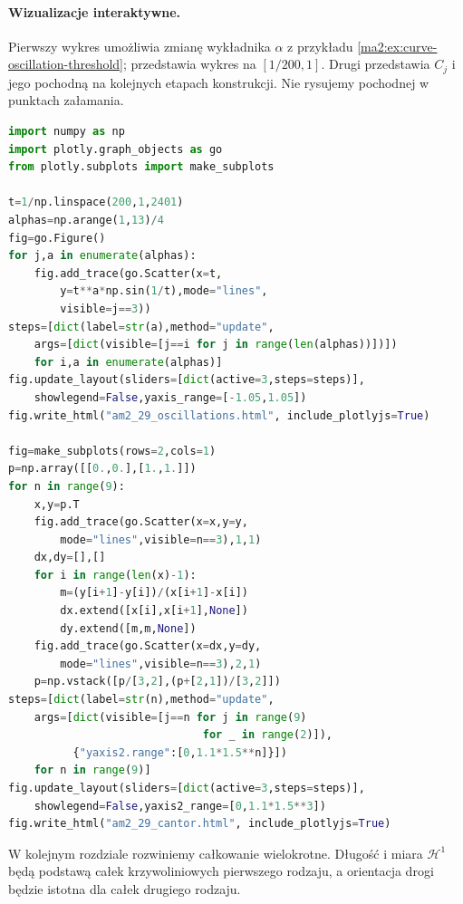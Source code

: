 \paragraph{Wizualizacje interaktywne.}
Pierwszy wykres umożliwia zmianę wykładnika
$\alpha$ z przykładu
\ref{ma2:ex:curve-oscillation-threshold};
przedstawia wykres na $[1/200,1]$.
Drugi przedstawia $C_j$ i jego pochodną
na kolejnych etapach konstrukcji.
Nie rysujemy pochodnej w punktach załamania.
\begin{lstlisting}[language=Python]
import numpy as np
import plotly.graph_objects as go
from plotly.subplots import make_subplots

t=1/np.linspace(200,1,2401)
alphas=np.arange(1,13)/4
fig=go.Figure()
for j,a in enumerate(alphas):
    fig.add_trace(go.Scatter(x=t,
        y=t**a*np.sin(1/t),mode="lines",
        visible=j==3))
steps=[dict(label=str(a),method="update",
    args=[dict(visible=[j==i for j in range(len(alphas))])])
    for i,a in enumerate(alphas)]
fig.update_layout(sliders=[dict(active=3,steps=steps)],
    showlegend=False,yaxis_range=[-1.05,1.05])
fig.write_html("am2_29_oscillations.html", include_plotlyjs=True)

fig=make_subplots(rows=2,cols=1)
p=np.array([[0.,0.],[1.,1.]])
for n in range(9):
    x,y=p.T
    fig.add_trace(go.Scatter(x=x,y=y,
        mode="lines",visible=n==3),1,1)
    dx,dy=[],[]
    for i in range(len(x)-1):
        m=(y[i+1]-y[i])/(x[i+1]-x[i])
        dx.extend([x[i],x[i+1],None])
        dy.extend([m,m,None])
    fig.add_trace(go.Scatter(x=dx,y=dy,
        mode="lines",visible=n==3),2,1)
    p=np.vstack([p/[3,2],(p+[2,1])/[3,2]])
steps=[dict(label=str(n),method="update",
    args=[dict(visible=[j==n for j in range(9)
                              for _ in range(2)]),
          {"yaxis2.range":[0,1.1*1.5**n]}])
    for n in range(9)]
fig.update_layout(sliders=[dict(active=3,steps=steps)],
    showlegend=False,yaxis2_range=[0,1.1*1.5**3])
fig.write_html("am2_29_cantor.html", include_plotlyjs=True)
\end{lstlisting}

W kolejnym rozdziale rozwiniemy całkowanie
wielokrotne. Długość i miara $\mathcal H^1$
będą podstawą całek krzywoliniowych pierwszego
rodzaju, a orientacja drogi będzie istotna dla
całek drugiego rodzaju.
